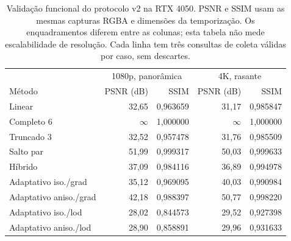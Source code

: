 \begin{table}[t]
\centering\small\setlength{\tabcolsep}{4pt}
\caption{Validação funcional do protocolo v2 na RTX 4050. PSNR e SSIM usam as mesmas capturas RGBA e dimensões da temporização. Os enquadramentos diferem entre as colunas; esta tabela não mede escalabilidade de resolução. Cada linha tem três consultas de coleta válidas por caso, sem descartes.}
\label{tab:v2quality}
\begin{tabular}{lrrrr}\toprule
 & \multicolumn{2}{c}{1080p, panorâmica} & \multicolumn{2}{c}{4K, rasante}\\
Método & PSNR (dB) & SSIM & PSNR (dB) & SSIM\\\midrule
Linear & 32,65 & 0,963659 & 31,17 & 0,985847\\
Completo 6 & $\infty$ & 1,000000 & $\infty$ & 1,000000\\
Truncado 3 & 32,52 & 0,957478 & 31,76 & 0,985509\\
Salto par & 51,99 & 0,999317 & 50,03 & 0,999633\\
Híbrido & 37,09 & 0,984116 & 36,89 & 0,994978\\
Adaptativo iso./grad & 35,12 & 0,969095 & 40,03 & 0,990984\\
Adaptativo aniso./grad & 42,18 & 0,988397 & 50,77 & 0,998220\\
Adaptativo iso./lod & 28,02 & 0,844573 & 29,52 & 0,927398\\
Adaptativo aniso./lod & 28,90 & 0,858891 & 29,96 & 0,931633\\
\bottomrule\end{tabular}
\end{table}
